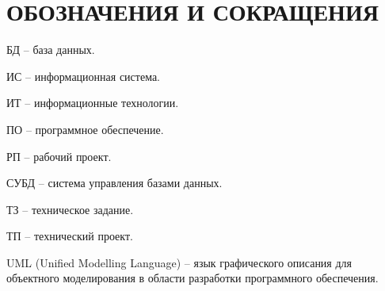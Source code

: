 \section*{ОБОЗНАЧЕНИЯ И СОКРАЩЕНИЯ}

БД -- база данных.

ИС -- информационная система.

ИТ -- информационные технологии. 



ПО -- программное обеспечение.

РП -- рабочий проект.

СУБД -- система управления базами данных.

ТЗ -- техническое задание.

ТП -- технический проект.

UML (Unified Modelling Language) -- язык графического описания для объектного моделирования в области разработки программного обеспечения.
